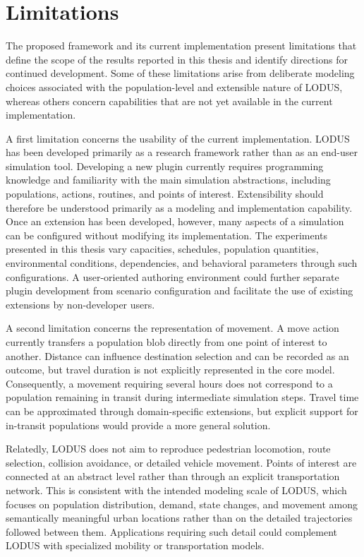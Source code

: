\section{Limitations}
\label{sec:limitations}

The proposed framework and its current implementation present limitations that
define the scope of the results reported in this thesis and identify directions for
continued development. Some of these limitations arise from deliberate modeling
choices associated with the population-level and extensible nature of LODUS, whereas
others concern capabilities that are not yet available in the current implementation.

A first limitation concerns the usability of the current implementation. LODUS
has been developed primarily as a research framework rather than as an end-user
simulation tool. Developing a new plugin currently requires programming knowledge
and familiarity with the main simulation abstractions, including populations, actions,
routines, and points of interest. Extensibility should therefore be understood primarily
as a modeling and implementation capability. Once an extension has been developed,
however, many aspects of a simulation can be configured without modifying its
implementation. The experiments presented in this thesis vary capacities, schedules,
population quantities, environmental conditions, dependencies, and behavioral
parameters through such configurations. A user-oriented authoring environment could
further separate plugin development from scenario configuration and facilitate the use
of existing extensions by non-developer users.

A second limitation concerns the representation of movement. A move action
currently transfers a population blob directly from one point of interest to another.
Distance can influence destination selection and can be recorded as an outcome, but
travel duration is not explicitly represented in the core model. Consequently, a
movement requiring several hours does not correspond to a population remaining in
transit during intermediate simulation steps. Travel time can be approximated through
domain-specific extensions, but explicit support for in-transit populations would provide
a more general solution.

Relatedly, LODUS does not aim to reproduce pedestrian locomotion, route selection,
collision avoidance, or detailed vehicle movement. Points of interest are connected at
an abstract level rather than through an explicit transportation network. This is
consistent with the intended modeling scale of LODUS, which focuses on population
distribution, demand, state changes, and movement among semantically meaningful
urban locations rather than on the detailed trajectories followed between them.
Applications requiring such detail could complement LODUS with specialized mobility
or transportation models.


